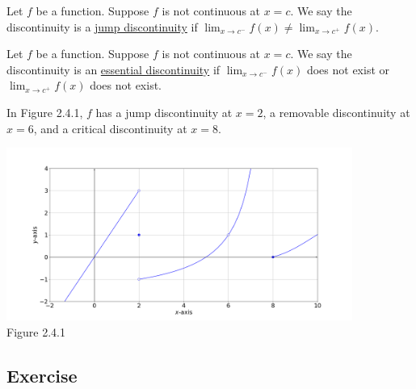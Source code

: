 \documentclass[11pt]{book}
\theoremstyle{break}
\theoremstyle{no_label}
\newcommand{\figtag}[1]{\\[-1.2em]Figure {#1}}
\numberwithin{equation}{section}
\begin{document}
\begin{definition}
    Let $f$ be a function. Suppose $f$ is not continuous at $x=c$. We say the discontinuity is a \underline{jump discontinuity} if $\displaystyle\lim_{x\to c^-}f(x)\ne\lim_{x\to c^+}f(x)$.
\end{definition}

\begin{definition}
    Let $f$ be a function. Suppose $f$ is not continuous at $x=c$. We say the discontinuity is an \underline{essential discontinuity} if $\displaystyle\lim_{x\to c^-}f(x)$ does not exist or $\displaystyle\lim_{x\to c^+}f(x)$ does not exist.
\end{definition}

\begin{example}
    In Figure 2.4.1, $f$ has a jump discontinuity at $x=2$, a removable discontinuity at $x=6$, and a critical discontinuity at $x=8$.
\end{example}

\begin{center}
    \includegraphics[width=0.85\textwidth]{discontinuity.png}\figtag{2.4.1}
\end{center}

\subsection*{Exercise}
\end{document}
